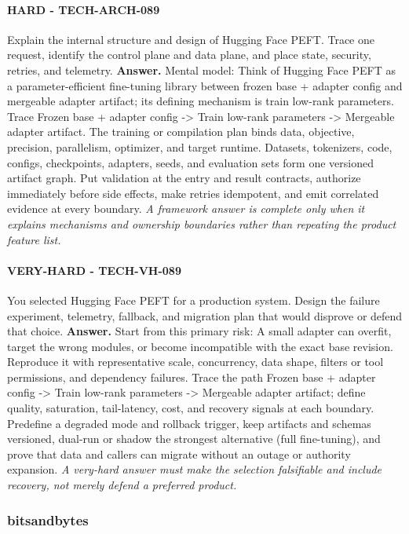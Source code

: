 \paragraph{HARD - TECH-ARCH-089} Explain the internal structure and design of Hugging Face PEFT. Trace one request, identify the control plane and data plane, and place state, security, retries, and telemetry.
\textbf{Answer.} Mental model: Think of Hugging Face PEFT as a parameter-efficient fine-tuning library between frozen base + adapter config and mergeable adapter artifact; its defining mechanism is train low-rank parameters. Trace Frozen base + adapter config -> Train low-rank parameters -> Mergeable adapter artifact. The training or compilation plan binds data, objective, precision, parallelism, optimizer, and target runtime. Datasets, tokenizers, code, configs, checkpoints, adapters, seeds, and evaluation sets form one versioned artifact graph. Put validation at the entry and result contracts, authorize immediately before side effects, make retries idempotent, and emit correlated evidence at every boundary.
\textit{A framework answer is complete only when it explains mechanisms and ownership boundaries rather than repeating the product feature list.}
\paragraph{VERY-HARD - TECH-VH-089} You selected Hugging Face PEFT for a production system. Design the failure experiment, telemetry, fallback, and migration plan that would disprove or defend that choice.
\textbf{Answer.} Start from this primary risk: A small adapter can overfit, target the wrong modules, or become incompatible with the exact base revision. Reproduce it with representative scale, concurrency, data shape, filters or tool permissions, and dependency failures. Trace the path Frozen base + adapter config -> Train low-rank parameters -> Mergeable adapter artifact; define quality, saturation, tail-latency, cost, and recovery signals at each boundary. Predefine a degraded mode and rollback trigger, keep artifacts and schemas versioned, dual-run or shadow the strongest alternative (full fine-tuning), and prove that data and callers can migrate without an outage or authority expansion.
\textit{A very-hard answer must make the selection falsifiable and include recovery, not merely defend a preferred product.}
\subsubsection*{bitsandbytes}
